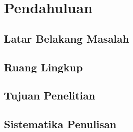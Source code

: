     \newpage

    

    {\centering
        \renewcommand{\thesection}{\arabic{section}.}
        \section{
            \fontsize{\fontChapterTitle}{0}\selectfont
            Pendahuluan
        }
    }

    \subsection{Latar Belakang Masalah}

    \subsection{Ruang Lingkup}

    \subsection{Tujuan Penelitian}

    \subsection{Sistematika Penulisan}

